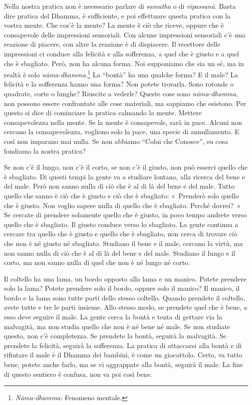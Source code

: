 Nella nostra pratica non è necessario parlare di
\emph{samatha} o di \emph{vipassanā}. Basta dire
pratica del Dhamma, è sufficiente, e poi effettuare questa pratica con
la vostra mente. Che cos'è la mente? La mente è ciò che riceve, oppure
che è consapevole delle impressioni sensoriali. Con alcune impressioni
sensoriali c'è una reazione di piacere, con altre la reazione è di
dispiacere. Il recettore delle impressioni ci conduce alla felicità e
alla sofferenza, a quel che è giusto e a quel che è sbagliato. Però, non
ha alcuna forma. Noi supponiamo che sia un sé, ma in realtà è solo
\emph{nāma-dhamma}.\footnote{\emph{Nāma-dhamma:} Fenomeno mentale.} La
``bontà'' ha una qualche forma? E il male? La felicità e la sofferenza
hanno una forma? Non potete trovarla. Sono rotonde o quadrate, corte o
lunghe? Riuscite a vederle? Queste cose sono \emph{nāma-dhamma}, non
possono essere confrontate alle cose materiali, ma sappiamo che
esistono. Per questo si dice di cominciare la pratica calmando la mente.
Mettere consapevolezza nella mente. Se la mente è consapevole, sarà in
pace. Alcuni non cercano la consapevolezza, vogliono solo la pace, una
specie di annullamento. E così non imparano mai nulla. Se non abbiamo
``Colui che Conosce'', su cosa fondiamo la nostra pratica?

Se non c'è il lungo, non c'è il corto, se non c'è il giusto, non può
esserci quello che è sbagliato. Di questi tempi la gente va a studiare
lontano, alla ricerca del bene e del male. Però non sanno nulla di ciò
che è al di là del bene e del male. Tutto quello che sanno è ciò che è
giusto e ciò che è sbagliato: «~Prenderò solo quello che è giusto. Non
voglio sapere nulla di quello che è sbagliato. Perché dovrei?~» Se
cercate di prendere solamente quello che è giusto, in poco tempo andrete
verso quello che è sbagliato. Il giusto conduce verso lo sbagliato. La
gente continua a cercare tra quello che è giusto e quello che è
sbagliato, non cerca di trovare ciò che non è né giusto né sbagliato.
Studiano il bene e il male, cercano la virtù, ma non sanno nulla di ciò
che è al di là del bene e del male. Studiano il lungo e il corto, ma non
sanno nulla di quel che non è né lungo né corto.

Il coltello ha una lama, un bordo opposto alla lama e un manico. Potete
prendere solo la lama? Potete prendere solo il bordo, oppure solo il
manico? Il manico, il bordo e la lama sono tutte parti dello stesso
coltello. Quando prendete il coltello, avete tutte e tre le parti
insieme. Allo stesso modo, se prendete quel che è bene, a esso deve
seguire il male. La gente cerca la bontà e tenta di gettare via la
malvagità, ma non studia quello che non è né bene né male. Se non
studiate questo, non c'è completezza. Se prendete la bontà, seguirà la
malvagità. Se prendete la felicità, seguirà la sofferenza. La pratica di
attaccarsi alla bontà e di rifiutare il male è il Dhamma dei bambini, è
come un giocattolo. Certo, va tutto bene, potete anche farlo, ma se vi
aggrappate alla bontà, seguirà il male. La fine di questo sentiero è
confusa, non va poi così bene.

